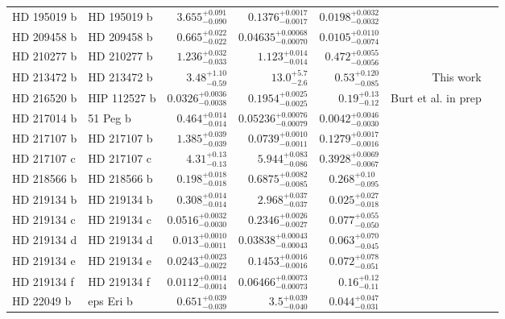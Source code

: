\begin{longtable*}{llrrrrr}
HD 195019 b & HD 195019 b & $3.655^{+0.091}_{-0.090}$ & $0.1376^{+0.0017}_{-0.0017}$ & $0.0198^{+0.0032}_{-0.0032}$ & \cite{Fischer99} & \\
HD 209458 b & HD 209458 b & $0.665^{+0.022}_{-0.022}$ & $0.04635^{+0.00068}_{-0.00070}$ & $0.0105^{+0.0110}_{-0.0074}$ & \cite{Henry00} & \\
HD 210277 b & HD 210277 b & $1.236^{+0.032}_{-0.033}$ & $1.123^{+0.014}_{-0.014}$ & $0.472^{+0.0055}_{-0.0056}$ & \cite{Marcy99} & \\
HD 213472 b & HD 213472 b & $3.48^{+1.10}_{-0.59}$ & $13.0^{+5.7}_{-2.6}$ & $0.53^{+0.120}_{-0.085}$ & This work & \\
HD 216520 b & HIP 112527 b & $0.0326^{+0.0036}_{-0.0038}$ & $0.1954^{+0.0025}_{-0.0025}$ & $0.19^{+0.13}_{-0.12}$ & Burt et al. in prep & \\
HD 217014 b & 51 Peg b & $0.464^{+0.014}_{-0.014}$ & $0.05236^{+0.00076}_{-0.00079}$ & $0.0042^{+0.0046}_{-0.0030}$ & \cite{Mayor95} & \\
HD 217107 b & HD 217107 b & $1.385^{+0.039}_{-0.039}$ & $0.0739^{+0.0010}_{-0.0011}$ & $0.1279^{+0.0017}_{-0.0016}$ & \cite{Vogt05} & \\
HD 217107 c & HD 217107 c & $4.31^{+0.13}_{-0.13}$ & $5.944^{+0.083}_{-0.086}$ & $0.3928^{+0.0069}_{-0.0067}$ & \cite{Vogt05} & \\
HD 218566 b & HD 218566 b & $0.198^{+0.018}_{-0.018}$ & $0.6875^{+0.0082}_{-0.0085}$ & $0.268^{+0.10}_{-0.095}$ & \cite{Meschiari11} & \\
HD 219134 b & HD 219134 b & $0.308^{+0.014}_{-0.014}$ & $2.968^{+0.037}_{-0.037}$ & $0.025^{+0.027}_{-0.018}$ & \cite{Vogt15} & \\
HD 219134 c & HD 219134 c & $0.0516^{+0.0032}_{-0.0030}$ & $0.2346^{+0.0026}_{-0.0027}$ & $0.077^{+0.055}_{-0.050}$ & \cite{Vogt15} & \\
HD 219134 d & HD 219134 d & $0.013^{+0.0010}_{-0.0011}$ & $0.03838^{+0.00043}_{-0.00043}$ & $0.063^{+0.070}_{-0.045}$ & \cite{Vogt15} & \\
HD 219134 e & HD 219134 e & $0.0243^{+0.0023}_{-0.0022}$ & $0.1453^{+0.0016}_{-0.0016}$ & $0.072^{+0.078}_{-0.051}$ & \cite{Vogt15} & \\
HD 219134 f & HD 219134 f & $0.0112^{+0.0014}_{-0.0014}$ & $0.06466^{+0.00073}_{-0.00073}$ & $0.16^{+0.12}_{-0.11}$ & \cite{Vogt15} & \\
HD 22049 b & eps Eri b & $0.651^{+0.039}_{-0.039}$ & $3.5^{+0.039}_{-0.040}$ & $0.044^{+0.047}_{-0.031}$ & \cite{Hatzes00} & \\

\end{longtable*}
